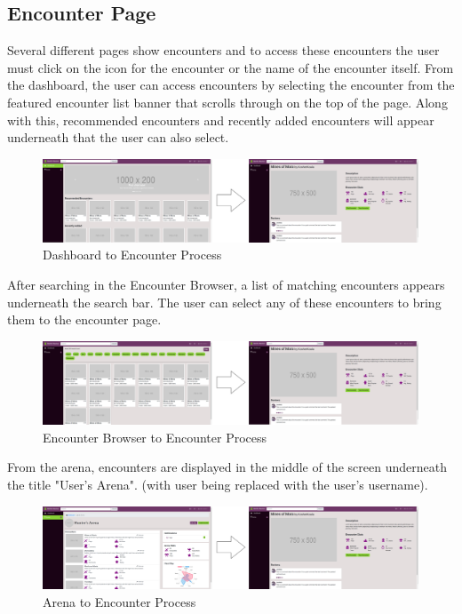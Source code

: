 \documentclass[12pt,a4paper]{report}
\begin{document}
		\subsection{Encounter Page}
		Several different pages show encounters and to access these encounters the user must click on the icon for the encounter or the name of the encounter itself. From the dashboard, the user can access encounters by selecting the encounter from the featured encounter list banner that scrolls through on the top of the page. Along with this, recommended encounters and recently added encounters will appear underneath that the user can also select.
		\begin{figure}[H]
			\centering
			\centerline{\includegraphics[scale=.16]{encounterDashNav}}
			\caption{Dashboard to Encounter Process}
			\label{fig: Dashboard to Encounter}
		\end{figure}
		After searching in the Encounter Browser, a list of matching encounters appears underneath the search bar. The user can select any of these encounters to bring them to the encounter page.
		\begin{figure}[H]
			\centering
			\centerline{\includegraphics[scale=.16]{encounterBrowserNav}}
			\caption{Encounter Browser to Encounter Process}
			\label{fig: Encounter Browser to Encounter}
		\end{figure}
		From the arena, encounters are displayed in the middle of the screen underneath the title "User's Arena". (with user being replaced with the user's username).
		\begin{figure}[H]	
			\centering
			\centerline{\includegraphics[scale=.16]{encounterArenaNav}}
			\caption{Arena to Encounter Process}
			\label{fig: Arena to Encounter}
		\end{figure}
		
\end{document}

